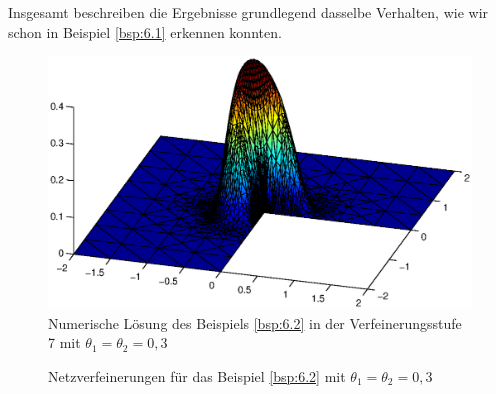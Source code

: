 \begin{bsp}
Insgesamt beschreiben die Ergebnisse grundlegend dasselbe Verhalten, wie wir schon in Beispiel \ref{bsp:6.1} erkennen konnten.

\begin{figure}[h]
\begin{center}
\includegraphics[width=13cm]{Abbildungen/num_loesung_rec7_bsp2.eps}
\end{center}
\caption{Numerische Lösung des Beispiels \ref{bsp:6.2} in der Verfeinerungsstufe 7 mit $\theta_1=\theta_2 = 0,3$\label{abb:6.4}}
\end{figure}

\begin{figure}[h]
\begin{center}
\hfill
{}
\end{center}
\caption{Netzverfeinerungen für das Beispiel \ref{bsp:6.2} mit $\theta_1=\theta_2=0,3$\label{abb:6.5}}
\end{figure}


\end{bsp}
